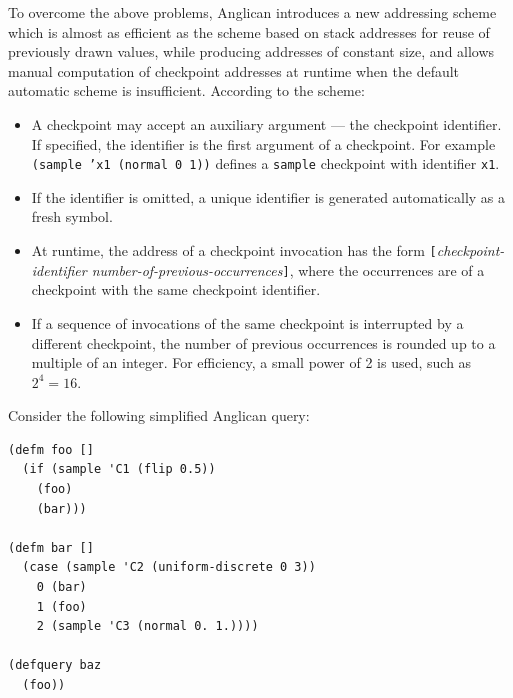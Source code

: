 \documentclass[preprint]{sigplanconf}
\begin{document}
To overcome the above problems, Anglican introduces a new
addressing scheme which is almost as efficient as the scheme
based on stack addresses for reuse of previously drawn values,
while producing addresses of constant size, and allows manual
computation of checkpoint addresses at runtime when the default
automatic scheme is insufficient. According to the scheme:
\begin{itemize}
    \item A checkpoint may accept an auxiliary argument --- the
        checkpoint identifier. If specified, the identifier is the first
        argument of a checkpoint. For example \texttt{(sample
        'x1  (normal 0 1))} defines a \texttt{sample} checkpoint
        with identifier \texttt{x1}.
    \item If the identifier is omitted, a unique identifier is
        generated automatically as a fresh symbol.
    \item At runtime, the address of a checkpoint invocation has
        the form
        \texttt{[}\textit{checkpoint-identifier
        number-of-previous-occurrences}\texttt{]}, where the
        occurrences are of a checkpoint with the same checkpoint
        identifier.
    \item If a sequence of invocations of the same checkpoint is
        interrupted by a different checkpoint, the number of
        previous occurrences is rounded up to a multiple of
        an integer. For efficiency, a small power of 2 is used,
        such as $2^4 = 16$.
\end{itemize}

Consider the following simplified Anglican query:

\begin{lstlisting}[style=default]
(defm foo []
  (if (sample 'C1 (flip 0.5))
    (foo)
    (bar)))

(defm bar []
  (case (sample 'C2 (uniform-discrete 0 3))
    0 (bar)
    1 (foo)
    2 (sample 'C3 (normal 0. 1.))))

(defquery baz
  (foo))
\end{lstlisting}
\end{document}
